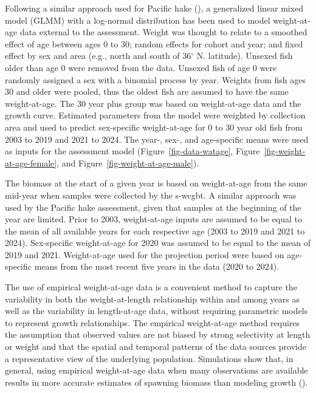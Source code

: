 \documentclass[
  english,
]{article}
\begin{document}
Following a similar approach used for Pacific hake
(), a generalized linear
mixed model (GLMM) with a log-normal distribution has been used to model
weight-at-age data external to the assessment. Weight was thought to
relate to a smoothed effect of age between ages 0 to 30; random effects
for cohort and year; and fixed effect by sex and area (e.g., north and
south of 36\(^\circ\) N. latitude). Unsexed fish older than age 0 were
removed from the data. Unsexed fish of age 0 were randomly assigned a
sex with a binomial process by year. Weights from fish ages 30 and older
were pooled, thus the oldest fish are assumed to have the same
weight-at-age. The 30 year plus group was based on weight-at-age data
and the growth curve. Estimated parameters from the model were weighted
by collection area and used to predict sex-specific weight-at-age for 0
to 30 year old fish from 2003 to 2019 and 2021 to 2024. The year-, sex-,
and age-specific means were used as inputs for the assessment model
(Figure~\ref{fig-data-watage}, Figure~\ref{fig-weight-at-age-female},
and Figure~\ref{fig-weight-at-age-male}).

The biomass at the start of a given year is based on weight-at-age from
the same mid-year when samples were collected by the \gls{s-wcgbt}. A
similar approach was used by the Pacific hake assessment, given that
samples at the beginning of the year are limited. Prior to 2003,
weight-at-age inputs are assumed to be equal to the mean of all
available years for each respective age (2003 to 2019 and 2021 to 2024).
Sex-specific weight-at-age for 2020 was assumed to be equal to the mean
of 2019 and 2021. Weight-at-age used for the projection period were
based on age-specific means from the most recent five years in the data
(2020 to 2024).

The use of empirical weight-at-age data is a convenient method to
capture the variability in both the weight-at-length relationship within
and among years as well as the variability in length-at-age data,
without requiring parametric models to represent growth relationships.
The empirical weight-at-age method requires the assumption that observed
values are not biased by strong selectivity at length or weight and that
the spatial and temporal patterns of the data sources provide a
representative view of the underlying population. Simulations show that,
in general, using empirical weight-at-age data when many observations
are available results in more accurate estimates of spawning biomass
than modeling growth ().
\end{document}

